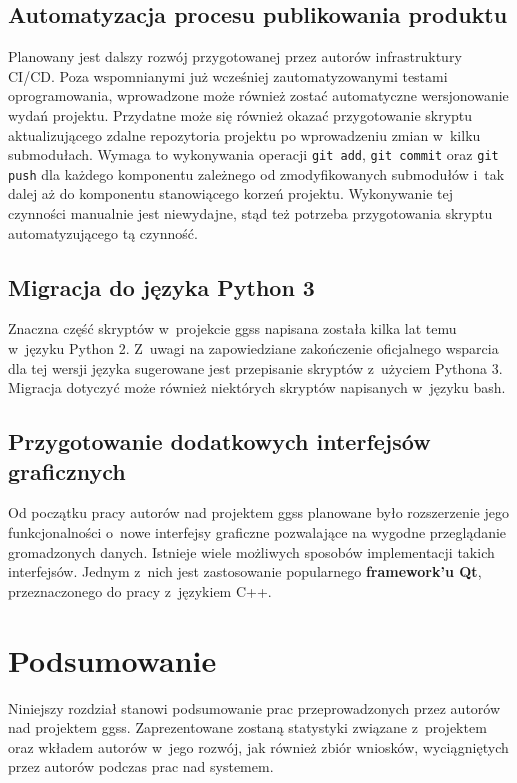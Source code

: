 \section{Automatyzacja procesu publikowania produktu}
Planowany jest dalszy rozwój przygotowanej przez autorów infrastruktury CI/CD. Poza wspomnianymi już wcześniej zautomatyzowanymi testami oprogramowania, wprowadzone może również zostać automatyczne wersjonowanie wydań projektu. Przydatne może się również okazać przygotowanie skryptu aktualizującego zdalne repozytoria projektu po wprowadzeniu zmian w~kilku submodułach. Wymaga to wykonywania operacji \lstinline{git add}, \lstinline{git commit} oraz \lstinline{git push} dla każdego komponentu zależnego od zmodyfikowanych submodułów i~tak dalej aż do komponentu stanowiącego korzeń projektu. Wykonywanie tej czynności manualnie jest niewydajne, stąd też potrzeba przygotowania skryptu automatyzującego tą czynność.


\section{Migracja do języka Python 3}
Znaczna część skryptów w~projekcie \gls*{ggss} napisana została kilka lat temu w~języku Python 2. Z~uwagi na zapowiedziane zakończenie oficjalnego wsparcia dla tej wersji języka sugerowane jest przepisanie skryptów z~użyciem Pythona 3. Migracja dotyczyć może również niektórych skryptów napisanych w~języku \gls*{bash}. 

\section{Przygotowanie dodatkowych interfejsów graficznych}
Od początku pracy autorów nad projektem \gls*{ggss} planowane było rozszerzenie jego funkcjonalności o~nowe interfejsy graficzne pozwalające na wygodne przeglądanie gromadzonych danych. Istnieje wiele możliwych sposobów implementacji takich interfejsów. Jednym z~nich jest zastosowanie popularnego \textbf{framework'u Qt}, przeznaczonego do pracy z~językiem C++. 


\chapter{Podsumowanie}
\label{cha:summary}
Niniejszy rozdział stanowi podsumowanie prac przeprowadzonych przez autorów nad projektem \gls*{ggss}. Zaprezentowane zostaną statystyki związane z~projektem oraz wkładem autorów w~jego rozwój, jak również zbiór wniosków, wyciągniętych przez autorów podczas prac nad systemem. 

